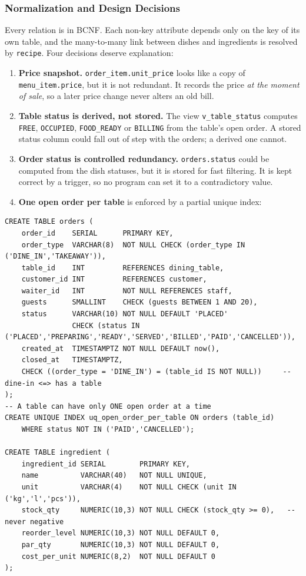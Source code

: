 \documentclass[11pt,a4paper]{report}
\begin{document}
\subsubsection{Normalization and Design Decisions}
Every relation is in BCNF. Each non-key attribute depends only on the key of its own table, and the many-to-many link between dishes and ingredients is resolved by \texttt{recipe}. Four decisions deserve explanation:
\begin{enumerate}
    \item \textbf{Price snapshot.} \texttt{order\_item.unit\_price} looks like a copy of \texttt{menu\_item.price}, but it is not redundant. It records the price \emph{at the moment of sale}, so a later price change never alters an old bill.
    \item \textbf{Table status is derived, not stored.} The view \texttt{v\_table\_status} computes \texttt{FREE}, \texttt{OCCUPIED}, \texttt{FOOD\_READY} or \texttt{BILLING} from the table's open order. A stored status column could fall out of step with the orders; a derived one cannot.
    \item \textbf{Order status is controlled redundancy.} \texttt{orders.status} could be computed from the dish statuses, but it is stored for fast filtering. It is kept correct by a trigger, so no program can set it to a contradictory value.
    \item \textbf{One open order per table} is enforced by a partial unique index:
\end{enumerate}
\begin{lstlisting}[caption={Key constraints from \texttt{01\_schema.sql}}]
CREATE TABLE orders (
    order_id    SERIAL      PRIMARY KEY,
    order_type  VARCHAR(8)  NOT NULL CHECK (order_type IN ('DINE_IN','TAKEAWAY')),
    table_id    INT         REFERENCES dining_table,
    customer_id INT         REFERENCES customer,
    waiter_id   INT         NOT NULL REFERENCES staff,
    guests      SMALLINT    CHECK (guests BETWEEN 1 AND 20),
    status      VARCHAR(10) NOT NULL DEFAULT 'PLACED'
                CHECK (status IN ('PLACED','PREPARING','READY','SERVED','BILLED','PAID','CANCELLED')),
    created_at  TIMESTAMPTZ NOT NULL DEFAULT now(),
    closed_at   TIMESTAMPTZ,
    CHECK ((order_type = 'DINE_IN') = (table_id IS NOT NULL))     -- dine-in <=> has a table
);
-- A table can have only ONE open order at a time
CREATE UNIQUE INDEX uq_open_order_per_table ON orders (table_id)
    WHERE status NOT IN ('PAID','CANCELLED');

CREATE TABLE ingredient (
    ingredient_id SERIAL        PRIMARY KEY,
    name          VARCHAR(40)   NOT NULL UNIQUE,
    unit          VARCHAR(4)    NOT NULL CHECK (unit IN ('kg','l','pcs')),
    stock_qty     NUMERIC(10,3) NOT NULL CHECK (stock_qty >= 0),   -- never negative
    reorder_level NUMERIC(10,3) NOT NULL DEFAULT 0,
    par_qty       NUMERIC(10,3) NOT NULL DEFAULT 0,
    cost_per_unit NUMERIC(8,2)  NOT NULL DEFAULT 0
);
\end{lstlisting}
\end{document}
